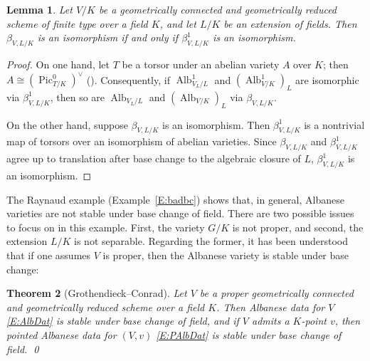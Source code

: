 \documentclass[11pt, reqno]{amsart}
\numberwithin{equation}{section}
\newtheorem{teo}{Theorem}[section]
\newtheorem{lem}[teo]{Lemma}
\theoremstyle{definition}
\theoremstyle{remark}
\DeclareMathOperator{\alb}{Alb}
\begin{document}
 \begin{lem}
  \label{L:betavsbeta1}
  Let $V/K$ be a geometrically connected and geometrically reduced  
  scheme of finite type over a field $K$, and let $L/K$ be an extension of fields.
  Then $\beta_{V,L/K}$ is an isomorphism if and only if $\beta^1_{V,L/K}$ is an
  isomorphism.
\end{lem}

 \begin{proof}
  On one hand, let $T$ be a torsor under an abelian variety $A$ over $K$; then $A\cong (\operatorname{Pic}^0_{T/K})^\vee$ ().
     Consequently, if $\alb^1_{V_L/L}$ and
  $(\alb^1_{V/K})_L$ are isomorphic via $\beta^1_{V,L/K}$, then so are $\alb_{V_L/L}$ and
  $(\alb_{V/K})_L$ via $\beta_{V,L/K}$.

  On the other hand, suppose $\beta_{V,L/K}$ is an isomorphism.  Then
  $\beta^1_{V,L/K}$ is a nontrivial map of torsors over an isomorphism of abelian
  varieties.  Since $\beta_{V,L/K}$ and $\beta^1_{V,L/K}$ agree up to translation after base change to the algebraic closure of $L$, $\beta^1_{V,L/K}$ is an isomorphism. 
 \end{proof}




 


 The Raynaud example (Example~\ref{E:badbc}) shows that, in general, Albanese varieties are not stable under base change of
 field.
 There are two possible issues to focus on in this example.  First, the
 variety $G/K$ is not proper, and second, the extension $L/K$ is not
 separable.  Regarding the former, it has been understood that if one
 assumes $V$ is proper, then the Albanese variety is stable under base change:

 \begin{teo}[Grothendieck--Conrad]\label{T:GrConBC-1}
  Let $V$ be a  \emph{proper} geometrically connected   and geometrically reduced 
  scheme  over a field $K$.  Then  Albanese data for $V$ \eqref{E:AlbDat} is stable under base change
  of field, and if $V$ admits a $K$-point $v$, then  pointed Albanese
 data for $(V,v)$ \eqref{E:PAlbDat} is stable
  under base change of field. \qed
 \end{teo}
\end{document}

